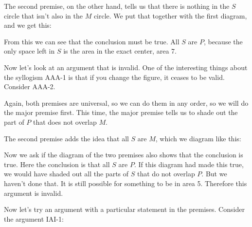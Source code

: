 

The second premise, on the other hand, tells us that there is nothing in the $S$ circle that isn't also in the $M$ circle. We put that together with the first diagram, and we get this:





From this we can see that the conclusion must be true. All $S$ are $P$, because the only space left in $S$ is the area in the exact center, area 7.

Now let's look at an argument that is invalid. One of the interesting things about the syllogism AAA-1 is that if you change the figure, it ceases to be valid. Consider AAA-2.

\begin{kormanize}
\end{kormanize}

Again, both premises are universal, so we can do them in any order, so we will do the major premise first. This time, the major premise tells us to shade out the part of $P$ that does not overlap $M$.





The second premise adds the idea that all $S$ are $M$, which we diagram like this:





Now we ask if the diagram of the two premises also shows that the conclusion is true. Here the conclusion is that all $S$ are $P$. If this diagram had made this true, we would have shaded out all the parts of $S$ that do not overlap $P$. But we haven't done that. It is still possible for something to be in area 5. Therefore this argument is invalid.

Now let's try an argument with a particular statement in the premises. Consider the argument IAI-1:

\begin{kormanize}
\end{kormanize}

